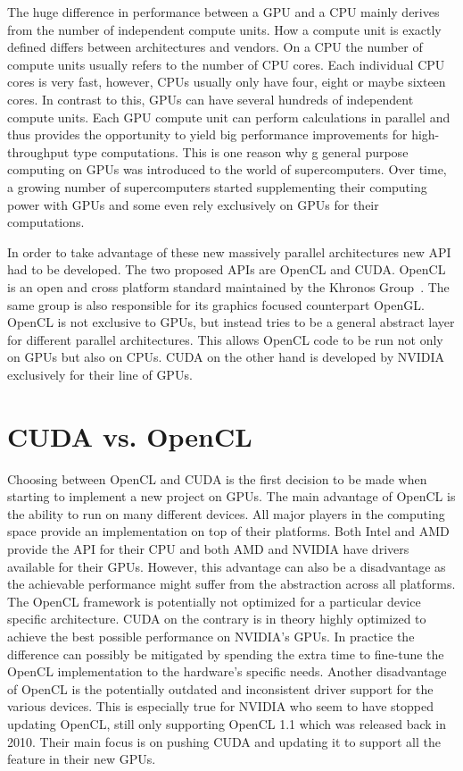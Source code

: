 The huge difference in performance between a GPU and a CPU mainly derives from the number of independent compute units. How a compute unit is exactly defined differs between architectures and vendors. On a CPU the number of compute units usually refers to the number of CPU cores. Each individual CPU cores is very fast, however, CPUs usually only have four, eight or maybe sixteen cores. In contrast to this, GPUs can have several hundreds of independent compute units. Each GPU compute unit can perform calculations in parallel and thus provides the opportunity to yield big performance improvements for high-throughput type computations. This is one reason why g general purpose computing on GPUs was introduced to the world of supercomputers. Over time, a growing number of supercomputers started supplementing their computing power with GPUs and some even rely exclusively on GPUs for their computations.

In order to take advantage of these new massively parallel architectures new API had to be developed. The two proposed APIs are OpenCL and CUDA. OpenCL is an open and cross platform standard maintained by the Khronos Group~\cite{OpenCL}. The same group is also responsible for its graphics focused counterpart OpenGL. OpenCL is not exclusive to GPUs, but instead tries to be a general abstract layer for different parallel architectures. This allows OpenCL code to be run not only on GPUs but also on CPUs. CUDA on the other hand is developed by NVIDIA exclusively for their line of GPUs.

\section{CUDA vs. OpenCL}

Choosing between OpenCL and CUDA is the first decision to be made when starting to implement a new project on GPUs. The main advantage of OpenCL is the ability to run on many different devices. All major players in the computing space provide an implementation on top of their platforms. Both Intel and AMD provide the API for their CPU and both AMD and NVIDIA have drivers available for their GPUs. However, this advantage can also be a disadvantage as the achievable performance might suffer from the abstraction across all platforms. The OpenCL framework is potentially not optimized for a particular device specific architecture. CUDA on the contrary is in theory highly optimized to achieve the best possible performance on NVIDIA's GPUs. In practice the difference can possibly be mitigated by spending the extra time to fine-tune the OpenCL implementation to the hardware's specific needs. Another disadvantage of OpenCL is the potentially outdated and inconsistent driver support for the various devices. This is especially true for NVIDIA who seem to have stopped updating OpenCL, still only supporting OpenCL 1.1 which was released back in 2010. Their main focus is on pushing CUDA and updating it to support all the feature in their new GPUs.

